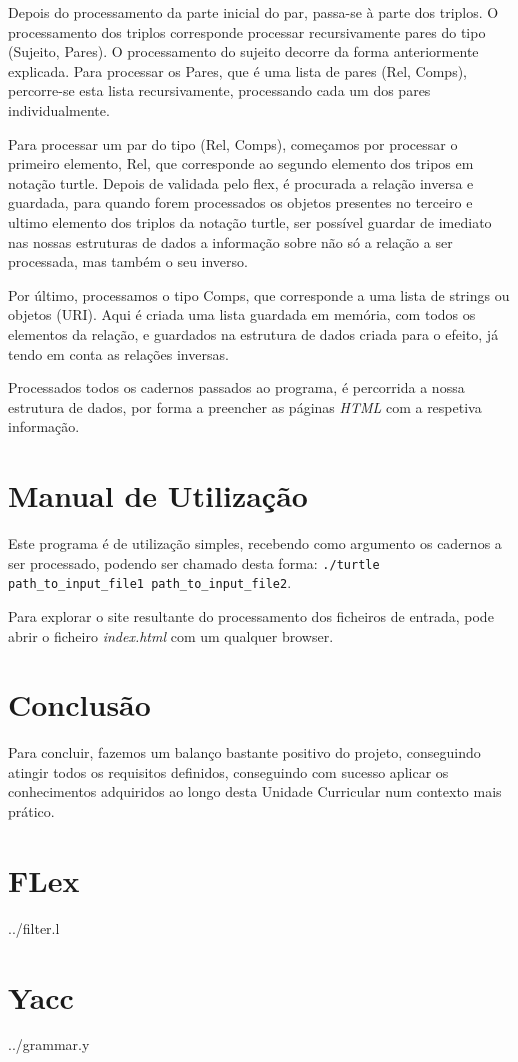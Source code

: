 \documentclass[a4paper]{report}
\begin{document}
Depois do processamento da parte inicial do par, passa-se à parte dos triplos.
O processamento dos triplos corresponde processar recursivamente pares do tipo
(Sujeito, Pares). O processamento do sujeito decorre da forma anteriormente
explicada. Para processar os Pares, que é uma lista de pares (Rel, Comps),
percorre-se esta lista recursivamente, processando cada um dos pares
individualmente.

Para processar um par do tipo (Rel, Comps), começamos por processar o primeiro
elemento, Rel, que corresponde ao segundo elemento dos tripos em notação turtle.
Depois de validada pelo flex, é procurada a relação inversa e guardada, para
quando forem processados os objetos presentes no terceiro e ultimo elemento dos
triplos da notação turtle, ser possível guardar de imediato nas nossas 
estruturas de dados a informação sobre não só a relação a ser processada, mas
também o seu inverso.

Por último, processamos o tipo Comps, que corresponde a uma lista de strings ou
objetos (URI). Aqui é criada uma lista guardada em memória, com todos os
elementos da relação, e guardados na estrutura de dados criada para o efeito,
já tendo em conta as relações inversas.

Processados todos os cadernos passados ao programa, é percorrida a nossa
estrutura de dados, por forma a preencher as páginas \textit{HTML} com a
respetiva informação.

\chapter{Manual de Utilização}

Este programa é de utilização simples, recebendo como argumento os cadernos a ser processado, 
podendo ser chamado desta forma: 
\verb!./turtle path_to_input_file1 path_to_input_file2!.

Para explorar o site resultante do processamento dos ficheiros de entrada, pode
abrir o ficheiro \textit{index.html} com um qualquer browser.

\chapter{Conclusão}

Para concluir, fazemos um balanço bastante positivo do projeto, conseguindo
atingir todos os requisitos definidos, conseguindo com sucesso aplicar os
conhecimentos adquiridos ao longo desta Unidade Curricular num contexto mais
prático.

\appendix

\chapter{FLex}

{../filter.l}

\chapter{Yacc} \label{apx:yacc}

{../grammar.y}
\end{document}
